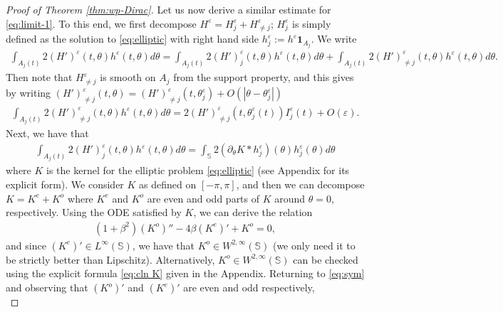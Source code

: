 \documentclass[10pt]{article}
\theoremstyle{definition}
\theoremstyle{remark}
\numberwithin{equation}{section}
\newcommand{\rd}{\partial}
\newcommand{\0}{\emptyset}
\newcommand{\bt}{\beta}
\newcommand{\tht}{\theta}
\newcommand{\varep}{\varepsilon}
\newcommand{\bbS}{\mathbb S}
\begin{document}
\begin{proof}[Proof of Theorem \ref{thm:wp-Dirac}]
		Let us now derive a similar estimate for \eqref{eq:limit-1}. To this end, we first decompose $H^\varep = H^\varep_j + H^\varep_{\ne j}$; $H^{\varep}_j$ is simply defined as the solution to \eqref{eq:elliptic} with right hand side $h^\varep_j := h^\varep \mathbf{1}_{A_{j}}$. We write \begin{equation*}
			\begin{split}
				\int_{A_{j}(t)} 2 (H')^\varep(t,\tht) h^\varep(t,\tht) d\tht = \int_{A_{j}(t)} 2 (H')^\varep_{j}(t,\tht) h^\varep(t,\tht) d\tht +\int_{A_{j}(t)} 2 (H')^\varep_{\ne j}(t,\tht) h^\varep(t,\tht) d\tht . 
			\end{split}
		\end{equation*} Then note that $H^\varep_{\ne j}$ is smooth on $A_{j}$ from the support property, and this gives by writing $(H')^\varep_{\ne j}(t,\tht) = (H')^\varep_{\ne j}(t,\tht_j^\varep) + O(|\tht - \tht_j^\varep|)$  \begin{equation*}
			\begin{split}
				\int_{A_{j}(t)} 2 (H')^\varep_{\ne j}(t,\tht) h^\varep(t,\tht) d\tht  = 2 (H')^\varep_{\ne j}(t,\tht^\varep_j(t)) I^{\varep}_j(t) + O(\varep). 
			\end{split}
		\end{equation*} Next, we have that \begin{equation}\label{eq:sym}
			\begin{split}
				\int_{A_{j}(t)} 2 (H')^\varep_{j}(t,\tht) h^\varep(t,\tht) d\tht = \int_{\bbS} 2 (\rd_\tht K*h^\varep_j) (\tht) h^\varep_j(\tht) d\tht 
			\end{split}
		\end{equation} where $K$ is the kernel for the elliptic problem \eqref{eq:elliptic} (see Appendix for its explicit form). We consider $K$ as defined on $[-\pi,\pi]$, and then we can decompose $K= K^e + K^o$ where $K^e$ and $K^o$ are even and odd parts of $K$ around $\tht = 0$, respectively. Using the ODE satisfied by $K$, we can derive the relation \begin{equation*}
			\begin{split}
				(1+\bt^2) (K^o)'' - 4\bt (K^e)' + K^o = 0, 
			\end{split}
		\end{equation*} and since $(K^e)' \in L^\infty(\bbS)$, we have that $K^o \in W^{2,\infty}(\bbS)$ (we only need it to be strictly better than Lipschitz). Alternatively, $K^o \in W^{2,\infty}(\bbS)$ can be checked using the explicit formula \eqref{eq:cln K} given in the Appendix. Returning to \eqref{eq:sym} and observing that $(K^o)'$ and $(K^e)'$ are even and odd respectively, \begin{equation*}

\end{equation*}
\end{proof}
\end{document}
